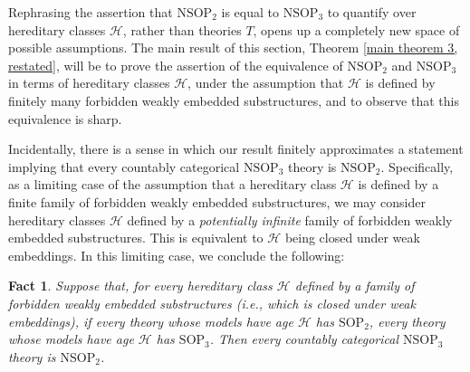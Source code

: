 \documentclass{amsart}
\newtheorem{fact}[theorem]{Fact}
\theoremstyle{definition}
\theoremstyle{remark}
\numberwithin{equation}{section}
\begin{document}
Rephrasing the assertion that $\mathrm{NSOP}_{2}$ is equal to $\mathrm{NSOP}_{3}$ to quantify over hereditary classes $\mathcal{H}$, rather than theories $T$, opens up a completely new space of possible assumptions. The main result of this section, Theorem \ref{main theorem 3, restated}, will be to prove the assertion of the equivalence of $\mathrm{NSOP}_{2}$ and $\mathrm{NSOP}_{3}$ in terms of hereditary classes $\mathcal{H}$, under the assumption that $\mathcal{H}$ is defined by finitely many forbidden weakly embedded substructures, and to observe that this equivalence is sharp.

Incidentally, there is a sense in which our result finitely approximates a statement implying that every countably categorical $\mathrm{NSOP}_{3}$ theory is $\mathrm{NSOP}_{2}$. Specifically, as a limiting case of the assumption that a hereditary class $\mathcal{H}$ is defined by a finite family of forbidden weakly embedded substructures, we may consider hereditary classes $\mathcal{H}$ defined by a \textit{potentially infinite} family of forbidden weakly embedded substructures. This is equivalent to $\mathcal{H}$ being closed under weak embeddings. In this limiting case, we conclude the following:

\begin{fact}
    Suppose that, for every hereditary class $\mathcal{H}$ defined by a family of forbidden weakly embedded substructures (i.e., which is closed under weak embeddings),  if every theory whose models have age $\mathcal{H}$ has $\mathrm{SOP}_{2}$, every theory whose models have age $\mathcal{H}$ has $\mathrm{SOP}_{3}$. Then every countably categorical $\mathrm{NSOP}_{3}$ theory is $\mathrm{NSOP}_{2}$.
\end{fact}
\end{document}
